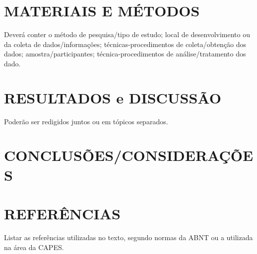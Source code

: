 \documentclass[a4paper, 12pt]{article}
\begin{document}
\section{MATERIAIS E MÉTODOS}

Deverá conter o método de pesquisa/tipo de estudo; local de desenvolvimento ou da coleta de dados/informações; técnicas-procedimentos de coleta/obtenção dos dados; amostra/participantes; técnica-procedimentos de análise/tratamento dos dado.


\section{RESULTADOS e DISCUSSÃO}

Poderão ser redigidos juntos ou em tópicos separados.


\section{CONCLUSÕES/CONSIDERAÇÕES}


\section{REFERÊNCIAS}

Listar as referências utilizadas no texto, segundo normas da ABNT ou a utilizada na área da CAPES.



\end{document}
